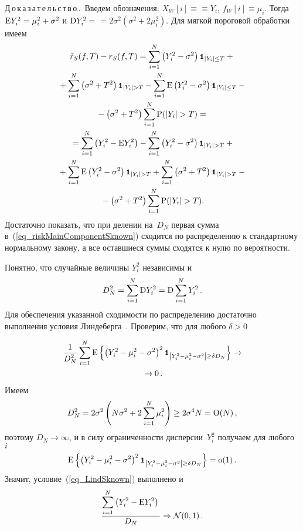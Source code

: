 \begin{multicols}{2}
\noindent
Д\,о\,к\,а\,з\,а\,т\,е\,л\,ь\,с\,т\,в\,о\,.\ 
Введем обозначения: $X_W[i]\equiv$\linebreak $\equiv Y_i$, $f_W[i]\equiv \mu_i$. 
Тогда $\textrm{E} Y_i^2=\mu_i^2+\sigma^2$ и $\textrm{D} Y_i^2 =$\linebreak 
$= 2\sigma^2\left(\sigma^2+2\mu_i^2\right)$. 
Для мягкой пороговой обработки имеем
\begin{multline}
\label{eq_riskMainComponentSknown}
\tilde{r}_S(f,T)-r_S(f,T)=\sum_{i=1}^N\left(Y_i^2-\sigma^2\right)\indYilT+{}\\
{}+\sum_{i=1}^N\left(\sigma^2+T^2\right)\indYigT- %
\sum_{i=1}^N\expct\left(Y_i^2-\sigma^2\right)\indYilT-{}\\
{}-\left(\sigma^2+T^2\right)\sum_{i=1}^N\prbblty(\left|Y_i\right|>T)={}\\
{}=\sum_{i=1}^N\left(Y_i^2-\expct Y_i^2\right)-\sum_{i=1}^N\left(Y_i^2-\sigma^2\right)\indYigT+{}\\
{}+\sum_{i=1}^N\expct\left(Y_i^2-\sigma^2\right)\indYigT+ %
\sum_{i=1}^N\left(\sigma^2+T^2\right)\indYigT-{}\\
{}-\left(\sigma^2+T^2\right)\sum_{i=1}^N\prbblty(\left|Y_i\right|>T).
\end{multline}
Достаточно показать, что при делении на~$D_N$ первая сумма в~(\ref{eq_riskMainComponentSknown}) 
сходится по распределению к стандартному нормальному закону, а все оставшиеся суммы сходятся к нулю по вероятности.

Понятно, что случайные величины $Y_i^2$ независимы и
\begin{equation*}
D_N^2=\sum_{i=1}^N\textrm{D} Y_i^2=\textrm{D}\sum_{i=1}^N Y_i^2\,.
\end{equation*}
Для обеспечения указанной сходимости по распределению достаточно выполнения условия Линдеберга~\cite{7mar}. 
Проверим, что для любого $\delta>0$

\noindent
\begin{multline}
\label{eq_LindSknown}
\displaystyle\frac{\displaystyle 1\mathstrut}{\displaystyle D_N^2\mathstrut}\sum_{i=1}^N\textrm{E}\left\{
\left(Y_i^2-\mu_i^2-\sigma^2\right)^2\mbox{{\small \tt {1}}\hspace{-1.5mm}{\tt 1}}_{\left|Y_i^2-\mu_i^2-\sigma^2\right|\geq \delta D_N}\right\}\rightarrow\\
{}\rightarrow 0\,.
\end{multline}
Имеем
\begin{equation*}
D_N^2=2\sigma^2\left(N\sigma^2+2\sum_{i=1}^N \mu_i^2\right)\geq 2\sigma^4N=\textrm{O}(N)\,,
\end{equation*}
поэтому $D_N\rightarrow\infty$, и в силу ограниченности дис\-пер\-сии~$Y_i^2$ получаем для любого~$i$
\begin{equation*}
\textrm{E}\left\{\left(Y_i^2-\mu_i^2-\sigma^2\right)^2\mbox{{\small \tt {1}}\hspace{-1.5mm}{\tt 1}}_{\left|Y_i^2-\mu_i^2-\sigma^2\right|\geq \delta D_N}\right\}=\textrm{o}(1)\,.
\end{equation*}
Значит, условие~(\ref{eq_LindSknown}) выполнено и
\begin{equation*}
\displaystyle\frac{\displaystyle \sum\limits_{i=1}^N\left(Y_i^2-\textrm{E} Y_i^2\right)\mathstrut}{\displaystyle D_N\mathstrut}\Rightarrow \mathcal{N}(0,1)\,.
\end{equation*}


\end{multicols}
